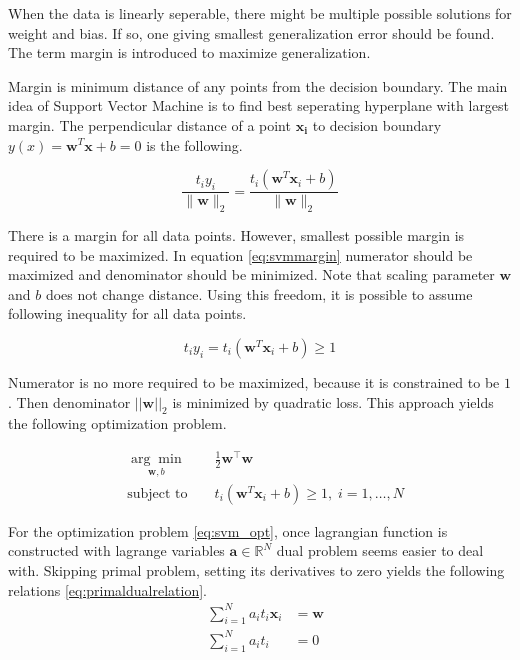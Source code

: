 When the data is linearly seperable, there might be multiple possible solutions for weight and bias. If so, one giving smallest generalization error should be found. The term margin is introduced to maximize generalization.

Margin is minimum distance of any points from the decision boundary. The main idea of Support Vector Machine is to find best seperating hyperplane with largest margin. The perpendicular distance of a point $\boldsymbol{x_i}$ to decision boundary $y(x) = \boldsymbol{w}^T \boldsymbol{x} + b = 0$ is the following.

\begin{equation}
\label{eq:svmmargin}
\frac{t_i y_i}{\| \boldsymbol{w} \|_2} = \frac{t_i (\boldsymbol{w}^T \boldsymbol{x}_i + b)}{\| \boldsymbol{w} \|_2}
\end{equation} 

There is a margin for all data points. However, smallest possible margin is required to be maximized. In equation \ref{eq:svmmargin} numerator should be maximized and denominator should be minimized. Note that scaling parameter $\boldsymbol{w}$ and $b$ does not change distance. Using this freedom, it is possible to assume following inequality for all data points.

\begin{equation}
\label{eq:svm_con1}
t_i y_i = t_i (\boldsymbol{w}^T \boldsymbol{x}_i + b) \geq 1
\end{equation} 

Numerator is no more required to be maximized, because it is constrained to be $1$. Then denominator $||\boldsymbol{w}||_2$ is minimized by quadratic loss. This approach yields the following optimization problem.

\begin{equation}
\label{eq:svm_opt}
\begin{aligned}
&\underset{\boldsymbol{w},b}{\arg\min}&&\frac{1}{2}\boldsymbol{w}^\intercal\boldsymbol{w} \\
&\text{subject to } &&t_i (\boldsymbol{w}^T \boldsymbol{x}_i + b) \geq 1, \; i=1,\ldots,N
\end{aligned}
\end{equation} 

For the optimization problem \ref{eq:svm_opt}, once lagrangian function is constructed with lagrange variables $\boldsymbol{a} \in \mathbb{R}^N$ dual problem seems easier to deal with. Skipping primal problem, setting its derivatives to zero yields the following relations \ref{eq:primaldualrelation}. 
\begin{equation}
\label{eq:primaldualrelation}
\begin{aligned}
&\sum_{i=1}^{N} a_i t_i \boldsymbol{x}_i &= \boldsymbol{w} \\
&\sum_{i=1}^{N} a_i t_i &= 0
\end{aligned}
\end{equation} 

